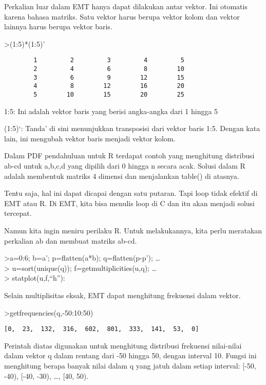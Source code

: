 \documentclass[
]{book}
\begin{document}
Perkalian luar dalam EMT hanya dapat dilakukan antar vektor. Ini otomatis karena bahasa matriks. Satu vektor harus berupa vektor kolom dan vektor lainnya harus berupa vektor baris.

\textgreater(1:5)*(1:5)'

\begin{verbatim}
        1         2         3         4         5 
        2         4         6         8        10 
        3         6         9        12        15 
        4         8        12        16        20 
        5        10        15        20        25 
\end{verbatim}

1:5: Ini adalah vektor baris yang berisi angka-angka dari 1 hingga 5

(1:5)`: Tanda' di sini menunjukkan transposisi dari vektor baris 1:5. Dengan kata lain, ini mengubah vektor baris menjadi vektor kolom.

Dalam PDF pendahuluan untuk R terdapat contoh yang menghitung distribusi ab-cd untuk a,b,c,d yang dipilih dari 0 hingga n secara acak. Solusi dalam R adalah membentuk matriks 4 dimensi dan menjalankan table() di atasnya.

Tentu saja, hal ini dapat dicapai dengan satu putaran. Tapi loop tidak efektif di EMT atau R. Di EMT, kita bisa menulis loop di C dan itu akan menjadi solusi tercepat.

Namun kita ingin meniru perilaku R. Untuk melakukannya, kita perlu meratakan perkalian ab dan membuat matriks ab-cd.

\textgreater a=0:6; b=a'; p=flatten(a*b); q=flatten(p-p'); \ldots{}\\
\textgreater{} u=sort(unique(q)); f=getmultiplicities(u,q); \ldots{}\\
\textgreater{} statplot(u,f,``h''):

Selain multiplisitas eksak, EMT dapat menghitung frekuensi dalam vektor.

\textgreater getfrequencies(q,-50:10:50)

\begin{verbatim}
[0,  23,  132,  316,  602,  801,  333,  141,  53,  0]
\end{verbatim}

Perintah diatas digunakan untuk menghitung distribusi frekuensi nilai-nilai dalam vektor q dalam rentang dari -50 hingga 50, dengan interval 10. Fungsi ini menghitung berapa banyak nilai dalam q yang jatuh dalam setiap interval: {[}-50, -40), {[}-40, -30), \ldots, {[}40, 50).
\end{document}
